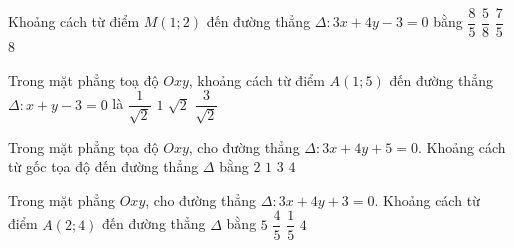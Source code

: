 

\begin{ex}%
	Khoảng cách từ điểm $M(1; 2)$ đến đường thẳng $\Delta\colon  3x+4y-3=0$ bằng
	 \choice
		{\True  $\dfrac{8}{5}$}
		{$\dfrac{5}{8}$} 
		 {$\dfrac{7}{5}$}
		 {$8$}
\end{ex}

\begin{ex}%
	Trong mặt phẳng toạ độ  $Oxy$, khoảng cách từ điểm $A(1;5)$ đến đường thẳng $\Delta \colon x+y-3=0$ là
	 \choice
		{$\dfrac{1}{\sqrt{2}}$} 
		 {$1$}
		{$\sqrt{2}$} 
		 {\True $\dfrac{3}{\sqrt{2}}$}
\end{ex}

\begin{ex}%
	Trong mặt phẳng tọa độ $Oxy$, cho  đường thẳng $\Delta\colon 3x+4y+5=0$. Khoảng cách từ gốc tọa độ đến đường thẳng $\Delta$ bằng
	 \choice
		{$2$} 
		{\True $1$} 
		{$3$} 
		 {$4$}
\end{ex}

\begin{ex}%
	Trong mặt phẳng $Oxy$, cho đường thẳng $\Delta  \colon 3x+4y+3=0$. Khoảng cách từ điểm $A\left(2;4\right)$ đến đường thẳng $\Delta$ bằng
	 \choice
		{\True  $5$}
		{$\dfrac{4}{5}$} 
		{$\dfrac{1}{5}$} 
		{$4$} 
\end{ex}

